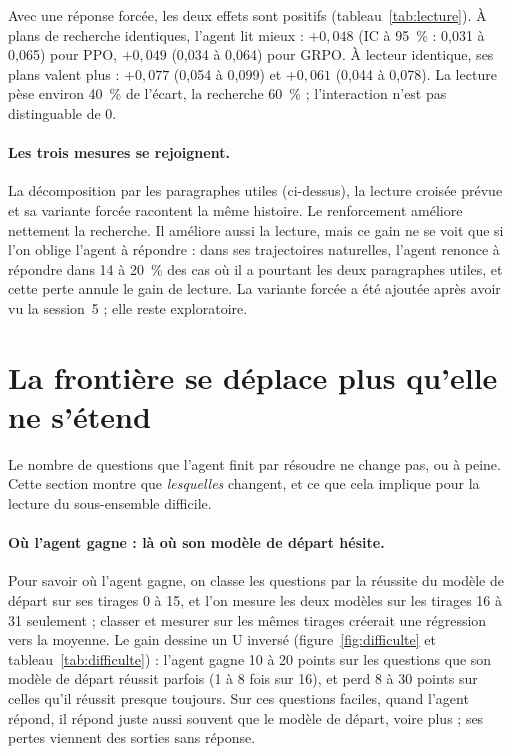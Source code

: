 \documentclass[11pt,a4paper]{article}
\begin{document}
Avec une réponse forcée, les deux effets sont positifs (tableau~\ref{tab:lecture}). À plans de recherche identiques, l'agent lit mieux : $+0{,}048$ (IC à 95~\% : 0,031 à 0,065) pour PPO, $+0{,}049$ (0,034 à 0,064) pour GRPO. À lecteur identique, ses plans valent plus : $+0{,}077$ (0,054 à 0,099) et $+0{,}061$ (0,044 à 0,078). La lecture pèse environ 40~\% de l'écart, la recherche 60~\% ; l'interaction n'est pas distinguable de 0.

\paragraph{Les trois mesures se rejoignent.} La décomposition par les paragraphes utiles (ci-dessus), la lecture croisée prévue et sa variante forcée racontent la même histoire. Le renforcement améliore nettement la recherche. Il améliore aussi la lecture, mais ce gain ne se voit que si l'on oblige l'agent à répondre : dans ses trajectoires naturelles, l'agent renonce à répondre dans 14 à 20~\% des cas où il a pourtant les deux paragraphes utiles, et cette perte annule le gain de lecture. La variante forcée a été ajoutée après avoir vu la session~5 ; elle reste exploratoire.



\section{La frontière se déplace plus qu'elle ne s'étend}\label{sec:frontiere-p2}

Le nombre de questions que l'agent finit par résoudre ne change pas, ou à peine. Cette section montre que \emph{lesquelles} changent, et ce que cela implique pour la lecture du sous-ensemble difficile.

\paragraph{Où l'agent gagne : là où son modèle de départ hésite.} Pour savoir où l'agent gagne, on classe les questions par la réussite du modèle de départ sur ses tirages 0 à 15, et l'on mesure les deux modèles sur les tirages 16 à 31 seulement ; classer et mesurer sur les mêmes tirages créerait une régression vers la moyenne. Le gain dessine un U inversé (figure~\ref{fig:difficulte} et tableau~\ref{tab:difficulte}) : l'agent gagne 10 à 20 points sur les questions que son modèle de départ réussit parfois (1 à 8 fois sur 16), et perd 8 à 30 points sur celles qu'il réussit presque toujours. Sur ces questions faciles, quand l'agent répond, il répond juste aussi souvent que le modèle de départ, voire plus ; ses pertes viennent des sorties sans réponse.
\end{document}
